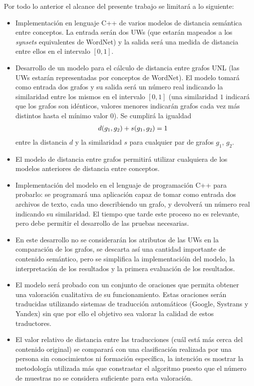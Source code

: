 \documentclass[a4paper,12pt,spanish]{book}
\begin{document}
Por todo lo anterior el alcance del presente trabajo se limitará a lo siguiente:
\begin{itemize}
\item {} 
Implementación en lenguaje C++ de varios modelos de distancia semántica entre
conceptos. La entrada serán dos UWs (que estarán mapeados a los \emph{synsets}
equivalentes de WordNet) y la salida será una medida de distancia entre ellos
en el intervalo \([0, 1]\).

\item {} 
Desarrollo de un modelo para el cálculo de distancia entre grafos UNL (las UWs
estarán representadas por conceptos de WordNet). El modelo
tomará como entrada dos grafos y su salida será un número real indicando la
similaridad entre los mismos en el intervalo \([0, 1]\) (una similaridad
\(1\) indicará que los grafos son idénticos, valores menores indicarán
grafos cada vez más distintos hasta el mínimo valor \(0\)).
Se cumplirá la igualdad
\begin{gather}
\begin{split}d(g_1, g_2) + s(g_1, g_2) = 1\end{split}\notag
\end{gather}
entre la distancia \(d\) y la similaridad \(s\) para cualquier par de grafos
\(g_1\), \(g_2\).

\item {} 
El modelo de distancia entre grafos permitirá utilizar cualquiera de los modelos
anteriores de distancia entre conceptos.

\item {} 
Implementación del modelo en el lenguaje de programación C++ para probarlo: se
programará una aplicación capaz de tomar como entrada dos archivos de texto, cada uno
describiendo un grafo, y devolverá un número real indicando su similaridad. El
tiempo que tarde este proceso no es relevante, pero debe permitir el desarrollo
de las pruebas necesarias.

\item {} 
En este desarrollo no se considerarán los atributos de las UWs en la
comparación de los grafos, se descarta así una cantidad importante de contenido
semántico, pero se simplifica la implementacióin del modelo, la interpretación
de los resultados y la primera evaluación de los resultados.

\item {} 
El modelo será probado con un conjunto de oraciones que permita obtener una
valoración cualitativa de su funcionamiento. Estas oraciones serán traducidas
utilizando sistemas de traducción automáticos (Google, Systrans y Yandex) sin que
por ello el objetivo sea valorar la calidad de estos traductores.

\item {} 
El valor relativo de distancia entre las traducciones (cuál está más cerca del
contenido original) se comparará con una clasificación realizada por una persona
sin conocimientos ni formación específica, la intención es mostrar la metodología
utilizada más que constrastar el algoritmo puesto que el número de muestras no
se considera suficiente para esta valoración.

\end{itemize}
\end{document}
